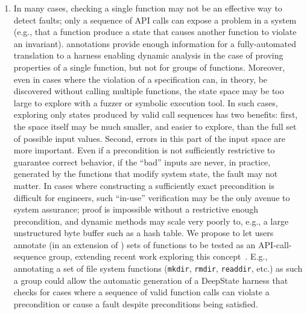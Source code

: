 \begin{enumerate}[labelsep=3pt,leftmargin=12pt]
\item In many cases, checking a single function may not be an effective way to detect faults; only a sequence of API calls can expose a problem in a system (e.g., that a function produce a state that causes another function to violate an invariant).  \acsl annotations provide enough information for a fully-automated translation to a harness enabling dynamic analysis in the case of proving properties of a single function, but not for groups of functions.  Moreover, even in cases where the violation of a specification can, in theory, be discovered without calling multiple functions, the state space may be too large to explore with a fuzzer or symbolic execution tool.  In such cases, exploring only states produced by valid call sequences has two benefits:  first, the space itself may be much smaller, and easier to explore, than the full set of possible input values.  Second, errors in this part of the input space are more important.  Even if a precondition is not sufficiently restrictive to guarantee correct behavior, if the ``bad'' inputs are never, in practice, generated by the functions that modify system state, the fault may not matter.  In cases where constructing a sufficiently exact precondition is difficult for engineers, such ``in-use'' verification may be the only avenue to system assurance; proof is impossible without a restrictive enough precondition, and dynamic methods may scale very poorly to, e.g., a large unstructured byte buffer such as a hash table.  We propose to let users annotate (in an extension of \acsl) sets of functions to be tested as an API-call-sequence group, extending recent work exploring this concept~\cite{blatter2018static,MetAcsl}.  E.g., annotating a set of file system functions ({\tt mkdir}, {\tt rmdir}, {\tt readdir}, etc.) as such a group could allow the automatic generation of a DeepState harness that checks for cases where a sequence of valid function calls can violate a precondition or cause a fault despite preconditions being satisfied.
\end{enumerate}

